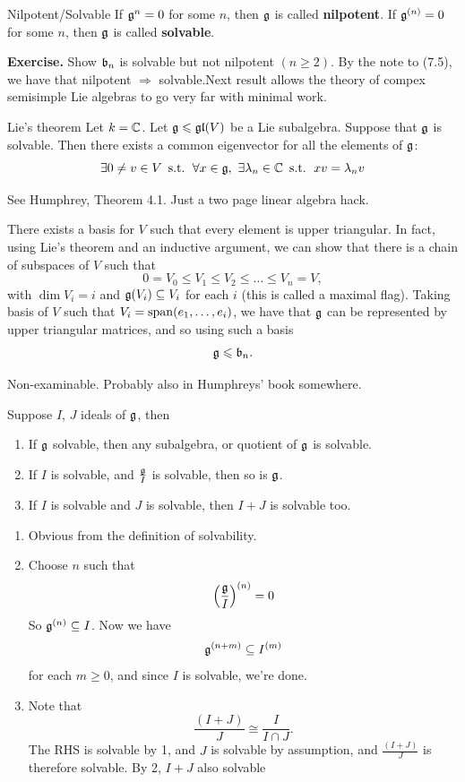 \documentclass{article}
\begin{document}
\begin{fancydefine}{Nilpotent/Solvable}
    If $\mathfrak{g}^{n}=0$ for some $n$, then $\mathfrak{g}$ is called \textbf{nilpotent}. If $\mathfrak{g}^{(n)}=0$ for some $n$, then $\mathfrak{g}$ is called \textbf{solvable}.
\end{fancydefine}
\textbf{Exercise. } Show $\mathfrak{b}_{n}$ is solvable but not nilpotent $(n \geq 2)$. By the note to (7.5), we have that nilpotent $\Rightarrow$ solvable.\gap Next result allows the theory of compex semisimple Lie algebras to go very far with minimal work.
\begin{fancythm}{Lie's theorem}
    Let $k=\mathbb{C}$. Let $\mathfrak{g} \leqslant \mathfrak{gl}(V)$ be a Lie subalgebra. Suppose that $\mathfrak{g}$ is solvable. Then there exists a common eigenvector for all the elements of $\mathfrak{g}$: \[ \exists 0 \neq v \in V \, \text{ s.t. } \, \forall x \in \mathfrak{g}, \, \, \exists \lambda_{n} \in \mathbb{C} \, \text{ s.t. } \, xv = \lambda_{n}v\]
\end{fancythm}
\proof See Humphrey, Theorem 4.1. Just a two page linear algebra hack.
\begin{corr}{}
    There exists a basis for $V$ such that every element is upper triangular. In fact, using Lie's theorem and an inductive argument, we can show that there is a chain of subspaces of $V$ such that \[ 0 = V_{0} \leq V_{1} \leq V_{2} \leq \dots \leq V_{n} =V, \] with $\dim V_{i}=i$ and $\mathfrak{g}(V_{i}) \subseteq V_{i}$ for each $i$ (this is called a maximal flag). Taking basis of $V$ such that $V_{i} = \operatorname{span} (e_{1}, \dots, e_{i})$, we have that $\mathfrak{g}$ can be represented by upper triangular matrices, and so using such a basis \[ \mathfrak{g} \leqslant \mathfrak{b}_{n}.\]
\end{corr}
\proof Non-examinable. Probably also in Humphreys' book somewhere. 
\begin{fancyprop}{}
    Suppose $I$, $J$ ideals of $\mathfrak{g}$, then \begin{enumerate}
        \item If $\mathfrak{g}$  solvable, then any subalgebra, or quotient of $\mathfrak{g}$ is solvable.
        \item If $I$ is solvable, and $\frac{\mathfrak{g}}{I}$ is solvable, then so is $\mathfrak{g}$.
        \item If $I$ is solvable and $J$ is solvable, then $I+J$ is solvable too.
    \end{enumerate}
\end{fancyprop}
\proof \hspace{0.1cm}
\begin{enumerate}
    \item Obvious from the definition of solvability.
    \item Choose $n$ such that \[\left(\frac{\mathfrak{g}}{I}\right)^{(n)}=0\] So $\mathfrak{g}^{(n)} \subseteq I$. Now we have \[\mathfrak{g}^{(n+m)} \subseteq I^{(m)}\] for each $m \geq 0$, and since $I$ is solvable, we're done.
    \item Note that \[ \frac{(I+J)}{J} \cong \frac{I}{I \cap J}.\] The RHS is solvable by 1, and $J$ is solvable by assumption, and $\frac{(I+J)}{J}$ is therefore solvable. By 2, $I+J$ also solvable
\end{enumerate}
\end{document}
